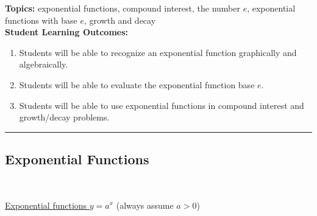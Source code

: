 

\noindent \textbf{Topics:}  exponential functions, compound interest, the number $e$, exponential functions with base $e$, growth and decay\\

\noindent \textbf{Student Learning Outcomes:}
\begin{enumerate}
\item Students will be able to recognize an exponential function graphically and algebraically.
\item Students will be able to evaluate the exponential function base $e$.
\item Students will be able to use exponential functions in compound interest and growth/decay problems.
\end{enumerate}

\hrule 

\bigskip

\subsection{Exponential Functions} ~

\noindent\underline{Exponential functions $y=a^x$} (always assume $a>0$) \\[.2in]

